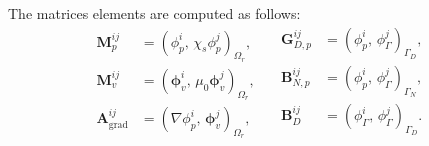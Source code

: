 \documentclass{ifacconf}
\begin{document}
The matrices elements are computed as follows:
\begin{equation*}
\begin{aligned}
\mathbf{M}_p^{ij} &= ({\phi}_{p}^i,\, \chi_s {\phi}_{p}^j)_{\Omega_r}, \\ \mathbf{M}_v^{ij} &= (\bm{\phi}_{v}^i,\, \mu_0 \bm{\phi}_{v}^j)_{\Omega_r}, \\
\mathbf{A}_{\mathrm{grad}}^{ij} &= (\nabla{\phi}_{p}^{i}, \, \bm{\phi}_{v}^j)_{\Omega_r}, 
\end{aligned} \quad 
\begin{aligned}
\mathbf{G}_{D, p}^{ij} &= ({\phi}_{p}^i,\, {\phi}_{\Gamma}^j)_{\Gamma_D}, \\ 
\mathbf{B}_{N, p}^{ij} &= ({\phi}_{p}^{i},\, {\phi}_{\Gamma}^{j})_{\Gamma_N}, \\
\mathbf{B}_{D}^{ij} &= ({\phi}_{\Gamma}^{i},\, {\phi}_{\Gamma}^{j})_{\Gamma_D}. \\
\end{aligned}
\end{equation*}
\end{document}

